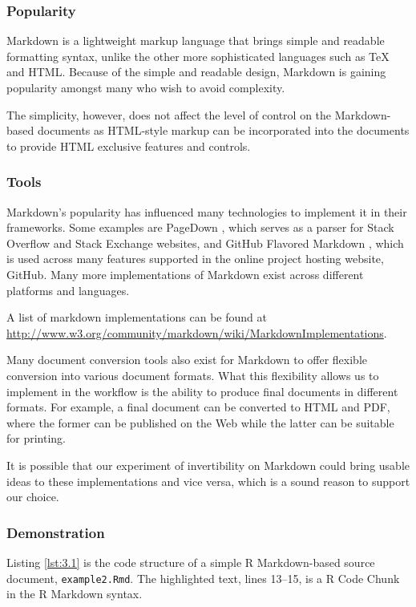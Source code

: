 \documentclass[a4paper, 12pt]{report}
\begin{document}
\subsubsection*{Popularity}
Markdown is a lightweight markup language that brings simple and readable formatting syntax, unlike the other more sophisticated languages such as TeX and HTML. Because of the simple and readable design, Markdown is gaining popularity amongst many who wish to avoid complexity.

The simplicity, however, does not affect the level of control on the Markdown-based documents as HTML-style markup can be incorporated into the documents to provide HTML exclusive features and controls.


\subsubsection*{Tools}
Markdown's popularity has influenced many technologies to implement it in their frameworks. Some examples are PageDown \citep{pagedown}, which serves as a parser for Stack Overflow and Stack Exchange websites, and GitHub Flavored Markdown \citep{gfm}, which is used across many features supported in the online project hosting website, GitHub. Many more implementations of Markdown exist across different platforms and languages.

A list of markdown implementations can be found at \url{http://www.w3.org/community/markdown/wiki/MarkdownImplementations}.

Many document conversion tools also exist for Markdown to offer flexible conversion into various document formats. What this flexibility allows us to implement in the workflow is the ability to produce final documents in different formats. For example, a final document can be converted to HTML and PDF, where the former can be published on the Web while the latter can be suitable for printing.

It is possible that our experiment of invertibility on Markdown could bring usable ideas to these implementations and vice versa, which is a sound reason to support our choice.


\subsubsection*{Demonstration}
Listing \ref{lst:3.1} is the code structure of a simple R Markdown-based source document, \texttt{example2.Rmd}. The highlighted text, lines 13--15, is a R Code Chunk in the R Markdown syntax.
\end{document}
